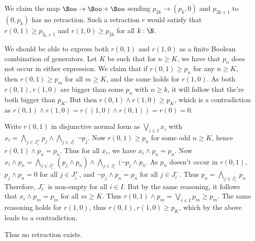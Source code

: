 We claim the map $\Boo \to \Boo+ \Boo$ sending $p_{2k} \to (p_k,0)$ and 
$p_{2k+1}$ to $(0,p_k)$ has no retraction. 
Such a retraction $r$ would satisfy that $r(0,1)\geq p_{2_k+1}$ and
$r(1,0) \geq p_{2k}$ for all $k:\N$. 

We should be able to express both $r(0,1)$ and $r(1,0)$ as a finite 
Boolean combination of generators. 
Let $K$ be such that for $n\geq K$, we have that 
$p_n$ does not occur in either expression.
We claim that if $r(0,1)\geq p_n$ for any $n\geq K$, then 
$r(0,1) \geq p_m$ for all $m\geq K$, and the same holds for $r(1,0)$. 
As both $r(0,1),r(1,0)$ are bigger than some $p_n$ with $n\geq k$, 
it will follow that the're both bigger than $p_K$. 
But then $r(0,1) \wedge r(1,0) \geq p_K$, which is 
a contradiction as $r(0,1) \wedge r(1,0) = r ((1,0)\wedge r(0,1)) = r (0) = 0$. 

Write $r(0,1)$ in disjunctive normal form as $\bigvee_{i\in I} x_i$
with $x_i = \bigwedge_{j\in J_i^+} p_j \wedge \bigwedge_{j\in J_i^-} \neg p_j$. 
Now $r(0,1) \geq p_n$ for some odd $n\geq K$, 
hence $r(0,1) \wedge p_n = p_n$. 
Thus for all $x_i$, we have $x_i \wedge p_n = p_n$. 
Now $x_i \wedge p_n = \bigwedge_{j\in J_i^+} (p_j\wedge p_n) 
\wedge \bigwedge_{j\in J_i^-} (\neg p_j \wedge p_n$. 
As $p_n$ doesn't occur in $r(0,1)$, $p_j \wedge p_n = 0$ for all $j\in J_i^+$, and
$\neg p_j \wedge p_n = p_n$ for all $j \in J_i^-$. 
Thus $p_n = \bigwedge_{j \in J_i^-} p_n$
Therefore, $J_i^-$ is non-empty for all $i\in I$. 
But by the same reasoning, it follows that $x_i \wedge p_m = p_m$ 
for all $m\geq K$. 
Thus $r(0,1) \wedge p_m = \bigvee_{i\in I} p_m \geq p_m$. 
The same reasoning holds for $r(1,0)$, thus 
$r(0,1) , r(1,0)\geq p_K$, which by the above leads to a contradiction. 

Thus no retraction exists. 
